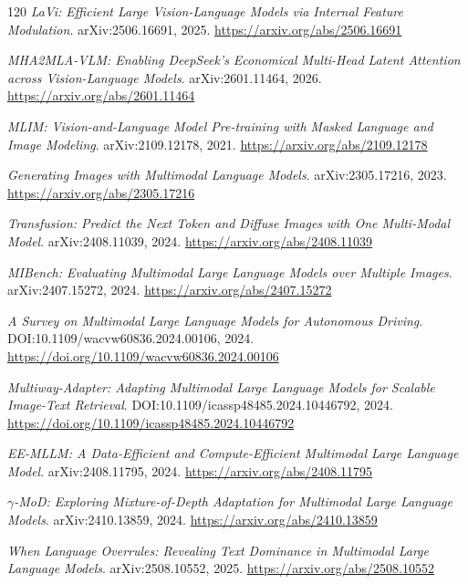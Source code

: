 \documentclass[11pt,a4paper]{article}
\begin{document}
\begin{thebibliography}{120}
\newblock \emph{LaVi: Efficient Large Vision-Language Models via Internal Feature Modulation}.
\newblock arXiv:2506.16691, 2025.
\newblock \url{https://arxiv.org/abs/2506.16691}

\newblock \emph{MHA2MLA-VLM: Enabling DeepSeek's Economical Multi-Head Latent Attention across Vision-Language Models}.
\newblock arXiv:2601.11464, 2026.
\newblock \url{https://arxiv.org/abs/2601.11464}

\newblock \emph{MLIM: Vision-and-Language Model Pre-training with Masked Language and Image Modeling}.
\newblock arXiv:2109.12178, 2021.
\newblock \url{https://arxiv.org/abs/2109.12178}

\newblock \emph{Generating Images with Multimodal Language Models}.
\newblock arXiv:2305.17216, 2023.
\newblock \url{https://arxiv.org/abs/2305.17216}

\newblock \emph{Transfusion: Predict the Next Token and Diffuse Images with One Multi-Modal Model}.
\newblock arXiv:2408.11039, 2024.
\newblock \url{https://arxiv.org/abs/2408.11039}

\newblock \emph{MIBench: Evaluating Multimodal Large Language Models over Multiple Images}.
\newblock arXiv:2407.15272, 2024.
\newblock \url{https://arxiv.org/abs/2407.15272}

\newblock \emph{A Survey on Multimodal Large Language Models for Autonomous Driving}.
\newblock DOI:10.1109/wacvw60836.2024.00106, 2024.
\newblock \url{https://doi.org/10.1109/wacvw60836.2024.00106}

\newblock \emph{Multiway-Adapter: Adapting Multimodal Large Language Models for Scalable Image-Text Retrieval}.
\newblock DOI:10.1109/icassp48485.2024.10446792, 2024.
\newblock \url{https://doi.org/10.1109/icassp48485.2024.10446792}

\newblock \emph{EE-MLLM: A Data-Efficient and Compute-Efficient Multimodal Large Language Model}.
\newblock arXiv:2408.11795, 2024.
\newblock \url{https://arxiv.org/abs/2408.11795}

\newblock \emph{$\gamma$-MoD: Exploring Mixture-of-Depth Adaptation for Multimodal Large Language Models}.
\newblock arXiv:2410.13859, 2024.
\newblock \url{https://arxiv.org/abs/2410.13859}

\newblock \emph{When Language Overrules: Revealing Text Dominance in Multimodal Large Language Models}.
\newblock arXiv:2508.10552, 2025.
\newblock \url{https://arxiv.org/abs/2508.10552}


\end{thebibliography}
\end{document}
